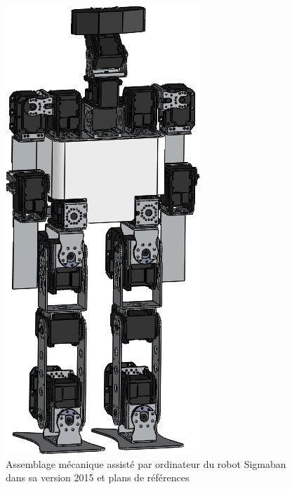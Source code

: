 \begin{figure}[htb]
\begin{center}
\begin{minipage}{0.3\linewidth}
            \includegraphics[width=\linewidth]{../media/sigmaban_cao2.png}
        \end{minipage}
        \caption{\label{fig:sigmaban_cao}Assemblage mécanique 
        assisté par ordinateur du robot Sigmaban dans sa version 2015 et plans
        de références}
    \end{center}
\end{figure}

